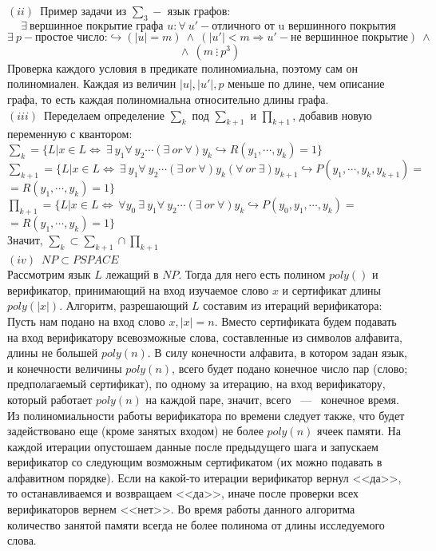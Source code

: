 \documentclass[a4paper,12pt]{article} %
\begin{document}
\noindent$(ii)$~Пример задачи из $\sum_3 - $ язык графов:\\
\[
\exists~\text{вершинное покрытие графа~}u:\forall~u'-\text{отличного от u вершинного покрытия}\]\[\exists~p-\text{простое число:}\hookrightarrow (|u| = m)~\wedge~(|u'| < m \Rightarrow u' - \text{не вершинное покрытие})~\wedge~\]\[~\wedge~(m ~\vdots~ p^3)
\]
Проверка каждого условия в предикате полиномиальна, поэтому сам он полиномиален. Каждая из величин $|u|, |u'|, p$ меньше по длине, чем описание графа, то есть каждая полиномиальна относительно длины графа.\\

$(iii)$~Переделаем определение $\sum_k$ под $\sum_{k+1}$ и $\prod_{k+1}$, добавив новую переменную с квантором:\\
$
\sum_k = \{L|x \in L \Leftrightarrow ~\exists~y_1 \forall~y_2\cdots(\exists~or~\forall)y_k \hookrightarrow R(y_1,\cdots
, y_k) = 1\}
$\\

\noindent$
\sum_{k+1} = \{L|x \in L \Leftrightarrow ~\exists~y_1 \forall~y_2\cdots(\exists~or~\forall)y_k(\forall~or~\exists)y_{k+1} \hookrightarrow P(y_1,\cdots
, y_k,y_{k+1}) =$ \\
$ = R(y_1,\cdots
, y_k) = 1\}$\\

\noindent $ \prod_{k+1} = \{L|x \in L \Leftrightarrow ~ \forall y_0~\exists~y_1 \forall~y_2\cdots(\exists~or~\forall)y_k \hookrightarrow P(y_0, y_1,\cdots
, y_k) = $ $ =R(y_1,\cdots
, y_k) = 1\}$\\

Значит, $\sum_k \subset \sum_{k+1}\cap\prod_{k+1}$\\

$(iv)$~$ NP \subset PSPACE$\\
Рассмотрим язык $L$ лежащий в $NP$. Тогда для него есть полином $poly()$ и верификатор, принимающий на вход изучаемое слово $x$ и сертификат длины $poly(|x|)$. Алгоритм, разрешающий $L$ составим  из итераций верификатора: \\

Пусть нам подано на вход слово $x, |x| = n$. Вместо сертификата будем подавать на вход верификатору всевозможные слова, составленные из символов алфавита, длины не большей $poly(n)$. В силу конечности алфавита, в котором задан язык, и конечности величины $poly(n)$, всего будет подано конечное число пар (слово; предполагаемый сертификат), по одному за итерацию, на вход верификатору, который работает $poly(n)$ на каждой паре, значит, всего ~---~ конечное время. Из полиномиальности работы верификатора по времени следует также, что будет задействовано еще (кроме занятых входом) не более $poly(n)$ ячеек памяти. На каждой итерации опустошаем данные после предыдущего шага и запускаем верификатор со следующим возможным сертификатом (их можно подавать в алфавитном порядке). Если на какой-то итерации верификатор вернул <<да>>, то останавливаемся и возвращаем <<да>>, иначе после проверки всех верификаторов вернем <<нет>>. Во время работы данного алгоритма количество занятой памяти всегда не более полинома от длины исследуемого слова.\\
\end{document}
